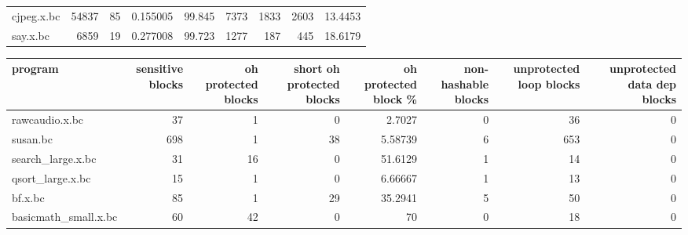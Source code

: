 \begin{table}[ht]
\begin{adjustbox}{width=1.3\textwidth}
\begin{tabular}{lrrrrrrrr}
 cjpeg.x.bc           &         54837 &                  85 &      0.155005  &       99.845  &               7373 &                             1833 &                        2603 &       13.4453  \\
 say.x.bc             &          6859 &                  19 &      0.277008  &       99.723  &               1277 &                              187 &                         445 &       18.6179  \\
\hline
\end{tabular}
\end{adjustbox}
\end{table}

\begin{table}[ht]
\centering
\begin{adjustbox}{width=1.3\textwidth}
\begin{tabular}{lrrrrrrr}
\hline
 program              &   sensitive blocks &   oh protected blocks &   short oh protected blocks &   oh protected block \% &   non-hashable blocks &   unprotected loop blocks &   unprotected data dep blocks \\
\hline
 rawcaudio.x.bc       &                 37 &                     1 &                           0 &                2.7027  &                     0 &                        36 &                             0 \\
 susan.bc             &                698 &                     1 &                          38 &                5.58739 &                     6 &                       653 &                             0 \\
 search\_large.x.bc    &                 31 &                    16 &                           0 &               51.6129  &                     1 &                        14 &                             0 \\
 qsort\_large.x.bc     &                 15 &                     1 &                           0 &                6.66667 &                     1 &                        13 &                             0 \\
 bf.x.bc              &                 85 &                     1 &                          29 &               35.2941  &                     5 &                        50 &                             0 \\
 basicmath\_small.x.bc &                 60 &                    42 &                           0 &               70       &                     0 &                        18 &                             0 \\

\end{tabular}
\end{adjustbox}
\end{table}
